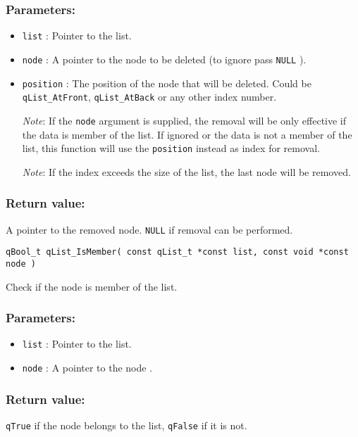 \subsubsection*{Parameters:}
\begin{itemize}
    \item \lstinline{list} : Pointer to the list. 
    \item \lstinline{node} : A pointer to the node to be deleted (to ignore pass \lstinline{NULL} ).
    \item \lstinline{position} : The position of the node that will be deleted. Could be \lstinline{qList_AtFront}, \lstinline{qList_AtBack} or any other index number.
    
    \textit{Note}: If the \lstinline{node} argument is supplied, the removal will be only effective if the data is member of the list. If ignored or the data is not a member of the list, this function will use the \lstinline{position} instead as index for removal.
    
    \textit{Note}: If the index exceeds the size of the list, the last node  will be removed.
\end{itemize}

\subsubsection*{Return value:}
A pointer to the removed node. \lstinline{NULL} if removal can be performed.

\noindent\hrulefill

\begin{lstlisting}[style=CStyle]
qBool_t qList_IsMember( const qList_t *const list, const void *const node )
\end{lstlisting}

Check if the node is member of the list. 

\subsubsection*{Parameters:}
\begin{itemize}
    \item \lstinline{list} : Pointer to the list. 
    \item \lstinline{node} : A pointer to the node .
\end{itemize}

\subsubsection*{Return value:}
\lstinline{qTrue} if the node belongs to the list, \lstinline{qFalse} if it is not.

